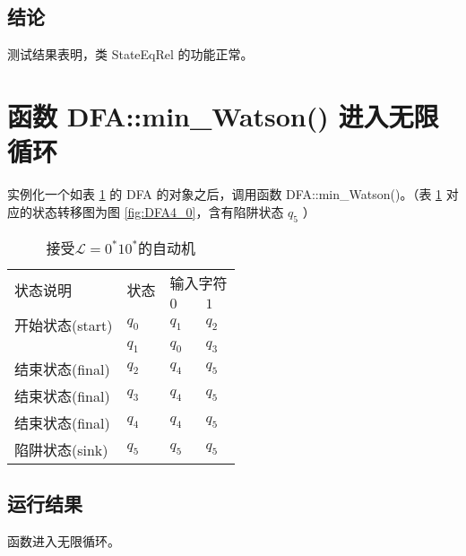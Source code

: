 \subsection{结论}

测试结果表明，类 StateEqRel 的功能正常。



\section{函数 DFA::min\_Watson() 进入无限循环}\label{sec:ohloop}

实例化一个如表 \ref{tab:DFA4} 的 DFA 的对象之后，调用函数 DFA::min\_Watson()。（表 \ref{tab:DFA4} 对应的状态转移图为图 \ref{fig:DFA4_0}，含有陷阱状态 $q_5$ ）

\begin{table}[!htbp]
    \caption{接受{$\mathcal{L}=0^*10^*$}的自动机{\cite{book1}}}
    \label{tab:DFA4}
    \centering
    \small%
    \setlength{\tabcolsep}{4pt}%
    \renewcommand{\arraystretch}{1.2}%
        \begin{tabular}{l p{3em}<{\centering} p{3em}<{\centering} p{3em}<{\centering}}
        \toprule %
        \multirow{2}{*}{状态说明} & \multirow{2}{*}{状态} & \multicolumn{2}{c}{输入字符} \\
		\cline{3-4}      &    &$0$ & $1$  \\
        \midrule%
        开始状态(start)  & $q_0$ & $q_1$   & $q_2$   \\
                        & $q_1$ & $q_0$   & $q_3$   \\
        结束状态(final) & $q_2$ & $q_4$   & $q_5$   \\
        结束状态(final) & $q_3$ & $q_4$   & $q_5$   \\
        结束状态(final) & $q_4$ & $q_4$   & $q_5$   \\
        陷阱状态(sink) & $q_5$ & $q_5$   & $q_5$   \\
        \bottomrule%
    \end{tabular}
\end{table}

\subsection{运行结果}
函数进入无限循环。

